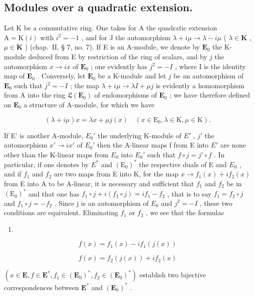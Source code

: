 \subsection{Modules over a quadratic extension.}

Let K be a commutative ring. One takes for A the quadratic extension \(\mathrm{A} = \mathrm{K}(i)\) with \(i^{2} = -1\) , and for J the automorphism \(\lambda + i\mu \to \lambda - i\mu\) ( \(\lambda \in \mathbf{K}\) , \(\mu \in \mathbf{K}\) ) (chap.~II, § 7, no. 7). If E is an A-module, we denote by \(\mathbf{E}_0\) the K-module deduced from E by restriction of the ring of scalars, and by \(j\) the automorphism \(x \to ix\) of \(\mathbf{E}_0\) ; one evidently has \(j^2 = -I\) , where I is the identity map of \(\mathbf{E}_0\) . Conversely, let \(\mathbf{E}_0\) be a K-module and let \(j\) be an automorphism of \(\mathbf{E}_0\) such that \(j^2 = -I\) ; the map \(\lambda + i\mu \to \lambda I + \mu j\) is evidently a homomorphism from A into the ring \(\mathfrak{L}(\mathbf{E}_0)\) of endomorphisms of \(\mathbf{E}_0\) ; we have therefore defined on \(\mathbf{E}_0\) a structure of A-module, for which we have

\[
(\lambda + i \mu) x = \lambda x + \mu j (x) \quad (x \in \mathrm{E} _ {0}, \lambda \in \mathrm{K}, \mu \in \mathrm{K}).\tag{2}
\]

If E' is another A-module, \(E_{0}'\) the underlying K-module of \(E'\) , \(j'\) the automorphism \(x' \rightarrow ix'\) of \(E_{0}'\) then the A-linear maps f from E into \(E'\) are none other than the K-linear maps from \(E_{0}\) into \(E_{0}'\) such that \(f \circ j = j' \circ f\) . In particular, if one denotes by \(E^{*}\) and \((\mathrm{E}_{0})^{*}\) the respective duals of E and \(E_{0}\) , and if \(f_{1}\) and \(f_{2}\) are two maps from E into K, for the map \(x \to f_{1}(x) + if_{2}(x)\) from E into A to be A-linear, it is necessary and sufficient that \(f_{1}\) and \(f_{2}\) be in \((\mathrm{E}_{0})^{*}\) and that one has \(f_{1} \circ j + i(f_{2} \circ j) = if_{1} - f_{2}\) , that is to say \(f_{1} = f_{2} \circ j\) and \(f_{1} \circ j = -f_{2}\) . Since j is an automorphism of \(E_{0}\) and \(j^{2} = -I\) , these two conditions are equivalent. Eliminating \(f_{1}\) or \(f_{2}\) , we see that the formulas

\begin{enumerate}
\def\labelenumi{(\arabic{enumi})}
\setcounter{enumi}{2}
\tightlist
\item
\end{enumerate}

\[
f (x) = f _ {1} (x) - i f _ {1} (j (x))\tag{4}
\]

\[
f (x) = f _ {2} (j (x)) + i f _ {2} (x)
\]

\((x \in \mathbf{E}, f \in \mathbf{E}^{*}, f_{1} \in (\mathbf{E}_{0})^{*}, f_{2} \in (\mathbf{E}_{0})^{*})\) establish two bijective correspondences between \(\mathbf{E}^{*}\) and \((\mathbf{E}_{0})^{*}\) .

